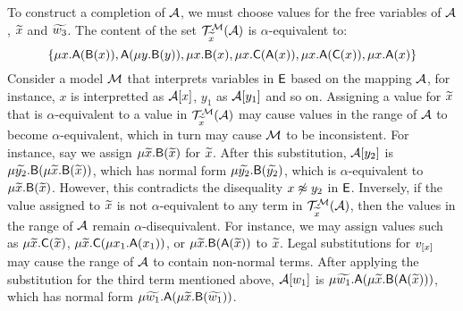 \begin{example}
To construct a completion of $\mathcal{A}$, we must choose values for the free variables of $\mathcal{A}$, ${\widetilde{x}}$ and ${\widetilde{w_3}}$.
The content of the set $\mathcal{T}^{\mathcal{M}}_{{\widetilde{x}}}( \mathcal{A} )$ is $\alpha$-equivalent to:
\[%
\{
\mu x. \const{A}( \const{B}( x )),
\const{A}( \mu y. \const{B}( y )),
\mu x. \const{B}( x ),
\mu x. \const{C}( \const{A}( x )),
\mu x. \const{A}( \const{C}( x )),
\mu x. \const{A}( x )
\}
\]
Consider a model $\mathcal{M}$ that interprets variables in $\mathsf{E}$ based on the mapping $\mathcal{A}$,
for instance, $x$ is interpretted as $\mathcal{A} [x]$, $y_1$ as $\mathcal{A} [y_1]$ and so on.
Assigning a value for ${\widetilde{x}}$ that is $\alpha$-equivalent to a value in $\mathcal{T}^{\mathcal{M}}_{{\widetilde{x}}}( \mathcal{A} )$
may cause values in the range of $\mathcal{A}$ to become $\alpha$-equivalent,
which in turn may cause $\mathcal{M}$ to be inconsistent.
For instance, say we assign $\mu {\widetilde{x}}. \textsf{B}( {\widetilde{x}} )$ for ${\widetilde{x}}$.
After this substitution, $\mathcal{A} [y_2]$ is $\mu {\widetilde{y_2}}. \textsf{B}( \mu {\widetilde{x}}. \textsf{B}( {\widetilde{x}} ) )$,
which has normal form $\mu {\widetilde{y_2}}. \textsf{B}( {\widetilde{y_2}} )$,
which is $\alpha$-equivalent to $\mu {\widetilde{x}}. \textsf{B}( {\widetilde{x}} )$.
However, this contradicts the disequality $x \not\approx y_2$ in $\mathsf{E}$.
Inversely, if the value assigned to ${\widetilde{x}}$ is not $\alpha$-equivalent to any term in $\mathcal{T}^{\mathcal{M}}_{{\widetilde{x}}}( \mathcal{A} )$,
then the values in the range of $\mathcal{A}$ remain $\alpha$-disequivalent.
For instance, we may assign values such as 
$\mu {\widetilde{x}}. \textsf{C}( {\widetilde{x}} )$,
$\mu {\widetilde{x}}. \textsf{C}( \mu x_1. \textsf{A}( x_1) )$, or
$\mu {\widetilde{x}}. \textsf{B}( \textsf{A}( {\widetilde{x}} ) )$
to ${\widetilde{x}}$.
Legal substitutions for $v_{[x]}$ may cause the range of $\mathcal{A}$ to contain non-normal terms.
After applying the substitution for the third term mentioned above,
$\mathcal{A} [w_1]$ is $\mu {\widetilde{w_1}}. \textsf{A}( \mu {\widetilde{x}}. \textsf{B}( \textsf{A}( {\widetilde{x}} ) ) )$,
which has normal form
$\mu {\widetilde{w_1}}. \textsf{A}( \mu {\widetilde{x}}. \textsf{B}( {\widetilde{w_1}} ) )$.
\xend
\end{example}


